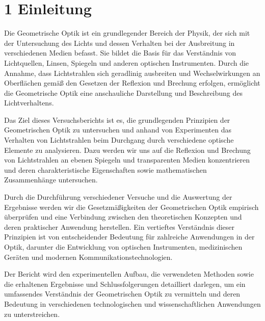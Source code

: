 \chapter*{1 Einleitung}
\setcounter{chapter}{1}
\setcounter{section}{0}
\setcounter{subsection}{0}

Die Geometrische Optik ist ein grundlegender Bereich der Physik, der sich mit der Untersuchung des Lichts und dessen Verhalten bei der Ausbreitung in verschiedenen Medien befasst. Sie bildet die Basis für das Verständnis von Lichtquellen, Linsen, Spiegeln und anderen optischen Instrumenten. Durch die Annahme, dass Lichtstrahlen sich geradlinig ausbreiten und Wechselwirkungen an Oberflächen gemäß den Gesetzen der Reflexion und Brechung erfolgen, ermöglicht die Geometrische Optik eine anschauliche Darstellung und Beschreibung des Lichtverhaltens.

Das Ziel dieses Versuchsberichts ist es, die grundlegenden Prinzipien der Geometrischen Optik zu untersuchen und anhand von Experimenten das Verhalten von Lichtstrahlen beim Durchgang durch verschiedene optische Elemente zu analysieren. Dazu werden wir uns auf die Reflexion und Brechung von Lichtstrahlen an ebenen Spiegeln und transparenten Medien konzentrieren und deren charakteristische Eigenschaften sowie mathematischen Zusammenhänge untersuchen.

Durch die Durchführung verschiedener Versuche und die Auswertung der Ergebnisse werden wir die Gesetzmäßigkeiten der Geometrischen Optik empirisch überprüfen und eine Verbindung zwischen den theoretischen Konzepten und deren praktischer Anwendung herstellen. Ein vertieftes Verständnis dieser Prinzipien ist von entscheidender Bedeutung für zahlreiche Anwendungen in der Optik, darunter die Entwicklung von optischen Instrumenten, medizinischen Geräten und modernen Kommunikationstechnologien.

Der Bericht wird den experimentellen Aufbau, die verwendeten Methoden sowie die erhaltenen Ergebnisse und Schlussfolgerungen detailliert darlegen, um ein umfassendes Verständnis der Geometrischen Optik zu vermitteln und deren Bedeutung in verschiedenen technologischen und wissenschaftlichen Anwendungen zu unterstreichen.